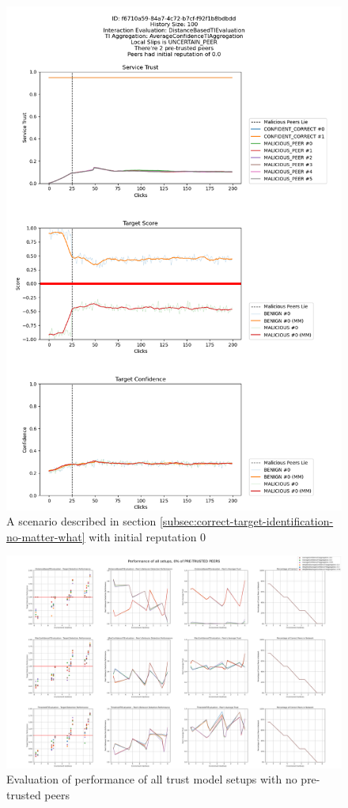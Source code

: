 \begin{figure}
    \centering
    \includegraphics[width=1.0\textwidth]{assets/best_worst_case}
    \caption{A scenario described in section \ref{subsec:correct-target-identification-no-matter-what} with initial reputation 0}
    \label{fig:worst-best-scenario}
\end{figure}

\begin{figure}
    \centering
    \includegraphics[width=0.9\paperwidth, angle=90]{assets/0_all_metrics.png}
    \caption{Evaluation of performance of all trust model setups with no pre-trusted peers}
    \label{fig:performance-all-setups-0-pretrusted}
\end{figure}

